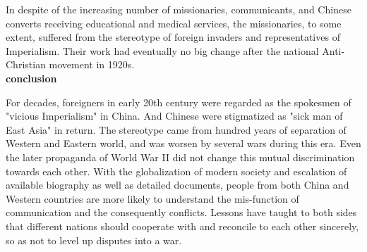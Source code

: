 \documentclass[11pt]{article}
\begin{document}
\begin{spacing}{2.0}
In despite of the increasing number of missionaries, communicants, and Chinese converts receiving educational and medical services, the missionaries, to some extent, suffered from the stereotype of foreign invaders and representatives of Imperialism. Their work had eventually no big change after the national Anti-Christian movement in 1920s.
\\
\textbf{conclusion}

For decades, foreigners in early 20th century were regarded as the spokesmen of "vicious Imperialism" in China. And Chinese were stigmatized as "sick man of East Asia" in return. The stereotype came from hundred years of separation of Western and Eastern world, and was worsen by several wars during this era. Even the later propaganda of World War II did not change this mutual discrimination towards each other. With the globalization of modern society and escalation of available biography as well as detailed documents, people from both China and Western countries are more likely to understand the mis-function of communication and the consequently conflicts. Lessons have taught to both sides that different nations should cooperate with and reconcile to each other sincerely, so as not to level up disputes into a war.
\end{spacing}

\printbibliography
\end{document}
